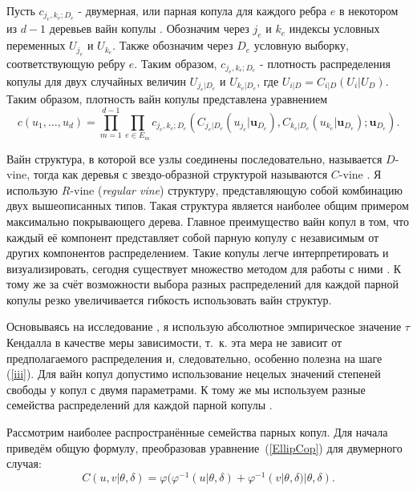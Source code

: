 Пусть $c_{j_e,k_e;D_e}$ - двумерная, или парная копула для каждого ребра $e$ в некотором из $d - 1$ деревьев вайн копулы \cite{Czado2010}. Обозначим через $j_e$ и $k_e$ индексы условных переменных $U_{j_e}$ и $U_{k_e}$. Также обозначим через $D_e$ условную выборку, соответствующую ребру $e$. Таким образом, $c_{j_e,k_e;D_e}$ - плотность распределения копулы для двух случайных величин $U_{j_e|D_e}$ и $U_{k_e|D_e}$, где $U_{i|D} = C_{i|D} (U_i|U_D)$. Таким образом, плотность вайн копулы представлена уравнением
%
\begin{equation}
    c(u_1, \ldots, u_d) = \prod_{m=1}^{d-1} \prod_{e \in E_m} c_{j_e,k_e;D_e} \left( C_{j_e|D_e} (u_{j_e}|\textbf{u}_{D_e}), C_{k_e|D_e} (u_{k_e}|\textbf{u}_{D_e}); \textbf{u}_{D_e} \right).
\end{equation}

Вайн структура, в которой все узлы соединены последовательно, называется $D$-vine, тогда как деревья с звездо-образной структурой называются $C$-vine \cite{Dissmann2013}. 
Я использую $R$-vine (\textit{regular vine}) структуру, представляющую собой комбинацию двух вышеописанных типов. 
Такая структура является наиболее общим примером максимально покрывающего дерева.
Главное преимущество вайн копул в том, что каждый её компонент представляет собой парную копулу с независимым от других компонентов распределением.
Такие копулы легче интерпретировать и визуализировать, сегодня существует множество методом для работы с ними \cite{Cooke2015, Czado2010, Dissmann2013}. 
К тому же за счёт возможности выбора разных распределений для каждой парной копулы резко увеличивается гибкость использовать вайн структур.

Основываясь на исследование \cite{Dissmann2013}, я использую абсолютное эмпирическое значение $\tau$ Кендалла в качестве меры зависимости, т.~к. эта мера не зависит от предполагаемого распределения и, следовательно, особенно полезна на шаге (\ref{iii}).
Для вайн копул допустимо использование нецелых значений степеней свободы у копул с двумя параметрами. 
К тому же мы используем разные семейства распределений для каждой парной копулы \cite{Bel2010}.

Рассмотрим наиболее распространённые семейства парных копул. 
Для начала приведём общую формулу, преобразовав уравнение~(\ref{EllipCop}) для двумерного случая:
%
\begin{equation} \label{BiArch}
    C(u,v|\theta,\delta) = \varphi (\varphi^{-1}(u|\theta,\delta) + \varphi^{-1}(v|\theta,\delta)|\theta,\delta).
\end{equation}

